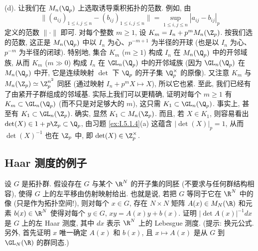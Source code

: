 \begin{solution}
(d). 让我们在 $M_n(\Q_p)$ 上选取诱导乘积拓扑的范数. 例如, 由
\[
\|(a_{ij})_{1 \leq i,j \leq n} - (b_{ij})_{1 \leq i,j \leq n}\| = \sup_{1 \leq i,j \leq n}|a_{ij} - b_{ij}|_p
\]
定义的范数 $\|\cdot\|$ 即可. 对每个整数 $m \geq 1$, 设 $K_m = I_n + p^mM_n(\Z_p)$. 按我们选的范数, 这正是 $M_n(\Q_p)$ 中以 $I_n$ 为心、$p^{-m+1}$ 为半径的开球 (也是以 $I_n$ 为心、$p^{-m}$ 为半径的闭球). 特别地, 集合 $K_m$ ($m \geq 1$) 构成 $I_n$ 在 $M_n(\Q_p)$ 中的开邻域族, 从而 $K_m$ ($m \gg 0$) 构成 $I_n$ 在 $\GL_n(\Q_p)$ 中的开邻域族 (因为 $\GL_n(\Q_p)$ 在 $M_n(\Q_p)$ 中开, 它是连续映射 $\det$ 下 $\Q_p$ 的开子集 $\Q_p^{\times}$ 的原像).
又注意 $K_m$ 与 $M_n(\Z_p) \simeq \Z_p^{n^2}$ 同胚 (通过映射 $I_n + p^mX \longmapsto X$), 所以它也紧.
至此, 我们已经有了由紧开子群组成的邻域基. 实际上我们可以更精确, 证明对每个 $m \geq 1$ 有 $K_m \subset \GL_n(\Q_p)$ (而不只是对足够大的 $m$), 这只需 $K_1 \subset \GL_n(\Q_p)$. 事实上, 甚至有 $K_1 \subset \GL_n(\Z_p)$. 确实, 显然 $K_1 \subset M_n(\Z_p)$. 而且, 若 $X \in K_1$, 则容易看出 $\det(X) \in 1 + p\Z_p \subset \Q_p$, 由习题 \ref{ex:I.5.1.4}(a) 这蕴含 $|\det(X)|_p = 1$, 从而 $\det(X)^{-1}$ 也在 $\Z_p$ 中, 即 $\det(X) \in \Z_p^{\times}$.
\end{solution}

\subsection{Haar 测度的例子}

\begin{exercise}
\label{ex:I.5.3.1}
设 $G$ 是拓扑群. 假设存在 $G$ 与某个 $\R^N$ 的开子集的同胚 (不要求与任何群结构相容), 使得 $G$ 上的左平移由仿射映射给出. 也就是说, 若把 $G$ 等同于它在 $\R^N$ 中的像 (只是作为拓扑空间!), 则对每个 $x \in G$, 存在 $N \times N$ 矩阵 $A(x) \in M_N(\R)$ 和元素 $b(x) \in \R^N$ 使得对每个 $y \in G$, $xy = A(x)y + b(x)$.
证明 $|\det A(x)|^{-1}dx$ 是 $G$ 上的左 Haar 测度, 其中 $dx$ 表示 $\R^N$ 上的 Lebesgue 测度. (提示: 换元公式. 另外, 首先证明 $x$ 唯一确定 $A(x)$ 和 $b(x)$, 且 $x \longmapsto A(x)$ 是从 $G$ 到 $\GL_N(\R)$ 的群同态.)
\end{exercise}

